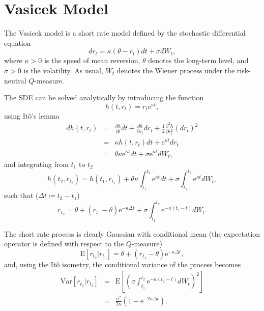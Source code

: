 \documentclass{report}
\newcommand{\E}{\mathrm{E}}
\newcommand{\Var}{\mathrm{Var}}
\newcommand{\e}{\text{e}}
\begin{document}
\section{Vasicek Model}
The Vasicek model \cite{Vasicek1977} is a short rate model defined by the stochastic differential equation 
\begin{equation}
dr_t = \kappa \left( \theta - r_t \right) dt + \sigma dW_t,
\end{equation}
where $\kappa > 0$ is the speed of mean reversion, $\theta$ denotes the long-term level, and $\sigma > 0$ is the volatility.
As usual, $W_t$ denotes the Wiener process under the risk-neutral $Q$-measure.

The SDE can be solved analytically by introducing the function
\begin{equation}
h(t, r_t) = r_t \e^{\kappa t},
\end{equation}
using It\^{o}'s lemma
\begin{eqnarray}
dh(t, r_t) &=& \frac{\partial h}{\partial t} dt + \frac{\partial h}{\partial r_t} dr_t + \frac{1}{2}\frac{\partial^2 h}{\partial r_t^2} \left(dr_t\right)^2 \\
&=& \kappa h(t, r_t) dt + \e^{\kappa t} dr_t \\
&=& \theta \kappa \e^{\kappa t} dt + \sigma \e^{\kappa t} dW_t,
\end{eqnarray}
and integrating from $t_1$ to $t_2$
\begin{equation}
h(t_2, r_{t_2}) = h(t_1, r_{t_1}) + \theta \kappa \int_{t_1}^{t_2} \e^{\kappa t} dt + \sigma \int_{t_1}^{t_2} \e^{\kappa t} dW_t,
\end{equation}
such that ($\Delta t \coloneq t_2 - t_1$)
\begin{equation}
r_{t_2} = \theta + \left( r_{t_1} - \theta \right) \e^{-\kappa \Delta t} + \sigma \int_{t_1}^{t_2} \e^{-\kappa \left(t_2 - t\right)} dW_t.
\end{equation}

The short rate process is clearly Gaussian with conditional mean (the expectation operator is defined with respect to the $Q$-measure)
\begin{equation}
\E \left[ r_{t_2} | r_{t_1} \right] = \theta + \left( r_{t_1} - \theta \right) \e^{-\kappa \Delta t},
\end{equation}
and, using the It\^{o} isometry, the conditional variance of the process becomes
\begin{eqnarray}
\Var \left[ r_{t_2} | r_{t_1} \right] &=& \E \left[ \left( \sigma \int_{t_1}^{t_2} \e^{-\kappa \left(t_2 - t\right)} dW_t \right)^2 \right] \\
&=& \frac{\sigma^2}{2 \kappa} \left( 1 - \e^{-2 \kappa \Delta t}\right).
\end{eqnarray}
\end{document}
